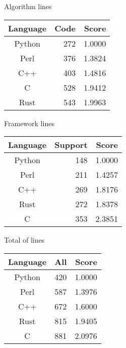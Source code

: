 \begin{subtable}{0.33\textwidth}
    \centering
    \caption{Algorithm lines}
    \label{table:sloc:algorithm}
    \begin{tabular}{|c|r|r|}
        \hline
        Language & Code & Score \\
        \hline
        Python & 272 & 1.0000 \\
        Perl & 376 & 1.3824 \\
        C++ & 403 & 1.4816 \\
        C & 528 & 1.9412 \\
        Rust & 543 & 1.9963 \\
        \hline
    \end{tabular}
\end{subtable}%
\begin{subtable}{0.33\textwidth}
    \centering
    \caption{Framework lines}
    \label{table:sloc:framework}
    \begin{tabular}{|c|r|r|}
        \hline
        Language & Support & Score \\
        \hline
        Python & 148 & 1.0000 \\
        Perl & 211 & 1.4257 \\
        C++ & 269 & 1.8176 \\
        Rust & 272 & 1.8378 \\
        C & 353 & 2.3851 \\
        \hline
    \end{tabular}
\end{subtable}%
\begin{subtable}{0.33\textwidth}
    \centering
    \caption{Total of lines}
    \label{table:sloc:all}
    \begin{tabular}{|c|r|r|}
        \hline
        Language & All & Score \\
        \hline
        Python & 420 & 1.0000 \\
        Perl & 587 & 1.3976 \\
        C++ & 672 & 1.6000 \\
        Rust & 815 & 1.9405 \\
        C & 881 & 2.0976 \\
        \hline
    \end{tabular}
\end{subtable}
